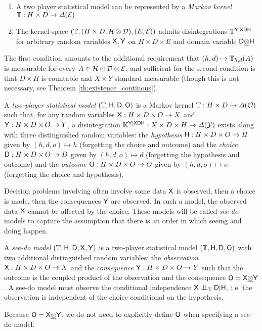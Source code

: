 \begin{enumerate}
    \item A two player statistical model can be represented by a \emph{Markov kernel} $\mathbb{T}:H\times D\to \Delta(\mathcal{E})$
    \item The kernel space $(\mathbb{T},(H\times D,\mathcal{H}\otimes\mathcal{D}),(E,\mathcal{E}))$ admits disintegrations $\mathbb{T}^{\mathsf{Y}|\mathsf{XDH}}$ for arbitrary random variables $\mathsf{X},\mathsf{Y}$ on $H\times D\times E$ and domain variable $\mathsf{D}\underline{\otimes}\mathsf{H}$
\end{enumerate}

The first condition amounts to the additional requirement that $(h,d)\mapsto \mathbb{T}_{h,d}(A)$ is measurable for every $A\in \mathcal{H}\otimes\mathcal{D}\otimes\mathcal{E}$, and sufficient for the second condition is that $D\times H$ is countable and $X\times Y$ standard measurable (though this is not necessary, see Theorem \ref{th:existence_continous}).

\begin{definition}\label{def:2p_stat}
A \emph{two-player statistical model} $(\mathbb{T},\mathsf{H},\mathsf{D},\mathsf{O})$ is a Markov kernel $\mathbb{T}:H\times D\to \Delta(\mathcal{O})$ such that, for any random variables $\mathsf{X}: H\times D\times O\to X$ and $\mathsf{Y}:H\times D\times O\to Y$, a disintegration $\mathbb{K}^{\mathsf{Y}|\mathsf{XDH}}:X\times D\times H\to \Delta(\mathcal{Y})$ exists along with three distinguished random variables: the \emph{hypothesis} $\mathsf{H}:H\times D\times O\to H$ given by $(h,d,o)\mapsto h$ (forgetting the choice and outcome) and the \emph{choice} $\mathsf{D}:H\times D\times O\to D$ given by $(h,d,o)\mapsto d$ (forgetting the hypothesis and outcome) and the \emph{outcome} $\mathsf{O}:H\times D\times O\to O$ given by $(h,d,o)\mapsto o$ (forgetting the choice and hypothesis).
\end{definition}

Decision problems involving often involve some data $\mathsf{X}$ is observed, then a choice is made, then the consequences $\mathsf{Y}$ are observed. In such a model, the observed data $\mathsf{X}$ cannot be affected by the choice. These models will be called \emph{see-do} models to capture the assumption that there is an order in which seeing and doing happen.

\begin{definition}\label{def:seedo}
A \emph{see-do model} $(\mathbb{T},\mathsf{H},\mathsf{D},\mathsf{X},\mathsf{Y})$ is a two-player statistical model $(\mathbb{T},\mathsf{H},\mathsf{D},\mathsf{O})$ with two additional distinguished random variables: the \emph{observation} $\mathsf{X}: H\times D\times O\to X$ and the \emph{consequence} $\mathsf{Y}:H\times D\times O\to Y$ such that the outcome is the coupled product of the observation and the consequence $\mathsf{O}=\mathsf{X}\underline{\otimes}\mathsf{Y}$. A see-do model must observe the conditional independence $\RV{X}\CI_\kernel{T} \RV{D}|\RV{H}$, i.e. the observation is independent of the choice conditional on the hypothesis.

Because $\mathsf{O}=\mathsf{X}\underline{\otimes} \mathsf{Y}$, we do not need to explicitly define $\mathsf{O}$ when specifying a see-do model.
\end{definition}


